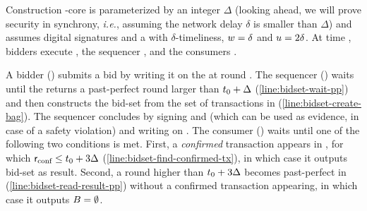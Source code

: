 \begin{protocol}\label{const:bidset}
	Construction \bidsettm-core is parameterized by an integer $\Delta$ (looking ahead, we will prove security in synchrony, \textit{i.e.}, assuming the network delay $\delta$ is smaller than $\Delta$) and assumes digital signatures and a \podtm with $\delta$-timeliness, $w=\delta$ and $u=2\delta$. At time \tzero, bidders execute , the sequencer , and the consumers .
\end{protocol}

\vspace{-3mm}

\vspace{-3mm}

\vspace{-3mm}


A bidder () submits a bid by writing it on the \podtm  at round \tzero.
The sequencer () waits until the \podtm returns a past-perfect round larger than $t_0 + \Delta$ (\cref{line:bidset-wait-pp}) and then constructs the bid-set \bag from the set of transactions in \txSet (\cref{line:bidset-create-bag}).
The sequencer concludes by signing \bag and \bidcert (which can be used as evidence, in case of a safety violation) and writing  \msgbidresult{(\bag, \bidcert, \sigma)} on \podInst.
The consumer () waits until one of the following two conditions is met.
First, a \emph{confirmed} transaction \msgbidresult{(\bag, \bidcert, \sigma)} appears in \txSet , for which $\textsf{r}_\text{conf} \leq t_0 + 3 \Delta$ (\cref{line:bidset-find-confirmed-tx}), in which case it outputs bid-set \bag as result.
Second, a round higher than $t_0 + 3 \Delta$ becomes past-perfect in \podtm (\cref{line:bidset-read-result-pp}) without a confirmed \msgbidresult{} transaction appearing, in which case it outputs $B=\emptyset$.

